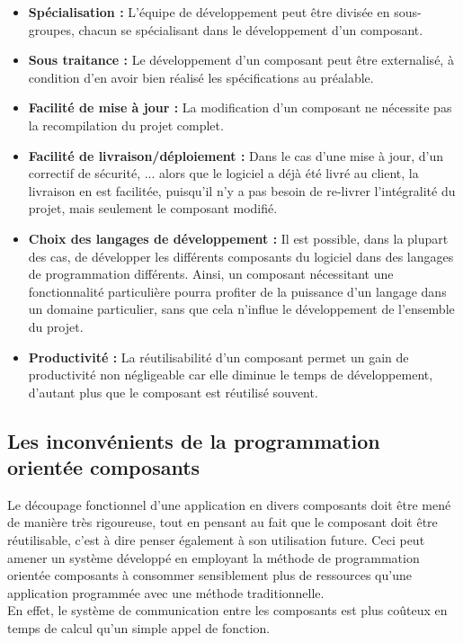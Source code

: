 \documentclass[12pt]{report}
\begin{document}
\begin{itemize}
    \item \textbf{Spécialisation :} L'équipe de développement peut être divisée en sous-groupes, chacun se spécialisant dans le développement d'un composant.
    \item \textbf{Sous traitance :} Le développement d'un composant peut être externalisé, à condition d'en avoir bien réalisé les spécifications au préalable.
    \item \textbf{Facilité de mise à jour :} La modification d'un composant ne nécessite pas la recompilation du projet complet.
    \newpage
    \vspace*{0.2in}
    \item \textbf{Facilité de livraison/déploiement :} Dans le cas d'une mise à jour, d'un correctif de sécurité, ... alors que le logiciel a déjà été livré au client, la livraison en est facilitée, puisqu'il n'y a pas besoin de re-livrer l'intégralité du projet, mais seulement le composant modifié.
    \item \textbf{Choix des langages de développement :} Il est possible, dans la plupart des cas, de développer les différents composants du logiciel dans des langages de programmation différents. Ainsi, un composant nécessitant une fonctionnalité particulière pourra profiter de la puissance d'un langage dans un domaine particulier, sans que cela n'influe le développement de l'ensemble du projet.
    \item \textbf{Productivité :} La réutilisabilité d'un composant permet un gain de productivité non négligeable car elle diminue le temps de développement, d'autant plus que le composant est réutilisé souvent. 
\end{itemize}

\vspace{0.1in}

\subsection{Les inconvénients de la programmation orientée composants}
\vspace{0.1in}
\hspace*{0.16in}
Le découpage fonctionnel d’une application en divers composants doit être mené de manière très rigoureuse, tout en pensant au fait que le composant doit être réutilisable, c’est à dire penser également à son utilisation future. Ceci peut amener un système développé en employant la méthode de programmation orientée composants à consommer sensiblement plus de ressources qu’une application programmée avec une méthode traditionnelle.
\\
En effet, le système de communication entre les composants est plus coûteux en temps de calcul qu’un simple appel de fonction.
\end{document}
